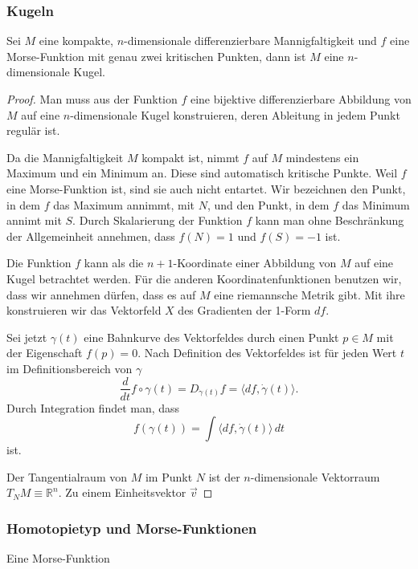 %
%
\subsubsection{Kugeln}

\begin{satz}
Sei $M$ eine kompakte, $n$-dimensionale differenzierbare Mannigfaltigkeit
und $f$ eine Morse-Funktion mit genau zwei kritischen Punkten, dann ist
$M$ eine $n$-dimensionale Kugel.
\end{satz}

\begin{proof}
Man muss aus der Funktion $f$ eine bijektive differenzierbare Abbildung
von $M$ auf eine $n$-dimensionale Kugel konstruieren, deren Ableitung
in jedem Punkt regulär ist.

Da die Mannigfaltigkeit $M$ kompakt ist, nimmt $f$ auf $M$ mindestens
ein Maximum und ein Minimum an.
Diese sind automatisch kritische Punkte.
Weil $f$ eine Morse-Funktion ist, sind sie auch nicht entartet.
Wir bezeichnen den Punkt, in dem $f$ das Maximum annimmt, mit $N$,
und den Punkt, in dem $f$ das Minimum annimt mit $S$.
Durch Skalarierung der Funktion $f$ kann man ohne Beschränkung der
Allgemeinheit annehmen, dass $f(N)=1$ und $f(S) = -1$ ist.

Die Funktion $f$ kann als die $n+1$-Koordinate einer Abbildung von $M$ 
auf eine Kugel betrachtet werden.
Für die anderen Koordinatenfunktionen benutzen wir, dass wir annehmen
dürfen, dass es auf $M$ eine riemannsche Metrik gibt.
Mit ihre konstruieren wir das Vektorfeld $X$ des Gradienten der 1-Form $df$.

Sei jetzt $\gamma(t)$ eine Bahnkurve des Vektorfeldes durch einen Punkt
$p\in M$ mit der Eigenschaft $f(p)=0$.
Nach Definition des Vektorfeldes ist für jeden Wert $t$ im Definitionsbereich
von $\gamma$
\[
\frac{d}{dt}f\circ\gamma(t)
=
D_{\dot{\gamma}(t)} f
=
\langle df, \dot{\gamma}(t) \rangle.
\]
Durch Integration findet man, dass
\[
f(\gamma(t))
=
\int \langle df,\dot{\gamma}(t)\rangle \,dt
\]
ist.



Der Tangentialraum von $M$ im Punkt $N$ ist der
$n$-dimensionale Vektorraum $T_NM\equiv \mathbb{R}^n$.
Zu einem Einheitsvektor $\vec{v}$ 

\end{proof}

\subsubsection{Homotopietyp und Morse-Funktionen}
Eine Morse-Funktion 

